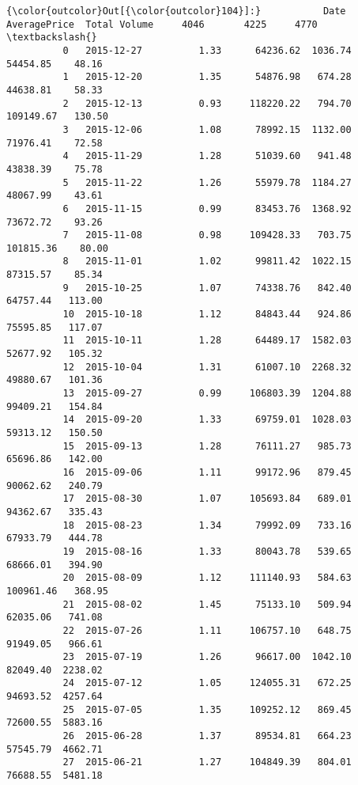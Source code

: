 \documentclass[11pt]{article}
\begin{document}
\begin{Verbatim}[commandchars=\\\{\}]
{\color{outcolor}Out[{\color{outcolor}104}]:}           Date  AveragePrice  Total Volume     4046       4225     4770  \textbackslash{}
          0   2015-12-27          1.33      64236.62  1036.74   54454.85    48.16   
          1   2015-12-20          1.35      54876.98   674.28   44638.81    58.33   
          2   2015-12-13          0.93     118220.22   794.70  109149.67   130.50   
          3   2015-12-06          1.08      78992.15  1132.00   71976.41    72.58   
          4   2015-11-29          1.28      51039.60   941.48   43838.39    75.78   
          5   2015-11-22          1.26      55979.78  1184.27   48067.99    43.61   
          6   2015-11-15          0.99      83453.76  1368.92   73672.72    93.26   
          7   2015-11-08          0.98     109428.33   703.75  101815.36    80.00   
          8   2015-11-01          1.02      99811.42  1022.15   87315.57    85.34   
          9   2015-10-25          1.07      74338.76   842.40   64757.44   113.00   
          10  2015-10-18          1.12      84843.44   924.86   75595.85   117.07   
          11  2015-10-11          1.28      64489.17  1582.03   52677.92   105.32   
          12  2015-10-04          1.31      61007.10  2268.32   49880.67   101.36   
          13  2015-09-27          0.99     106803.39  1204.88   99409.21   154.84   
          14  2015-09-20          1.33      69759.01  1028.03   59313.12   150.50   
          15  2015-09-13          1.28      76111.27   985.73   65696.86   142.00   
          16  2015-09-06          1.11      99172.96   879.45   90062.62   240.79   
          17  2015-08-30          1.07     105693.84   689.01   94362.67   335.43   
          18  2015-08-23          1.34      79992.09   733.16   67933.79   444.78   
          19  2015-08-16          1.33      80043.78   539.65   68666.01   394.90   
          20  2015-08-09          1.12     111140.93   584.63  100961.46   368.95   
          21  2015-08-02          1.45      75133.10   509.94   62035.06   741.08   
          22  2015-07-26          1.11     106757.10   648.75   91949.05   966.61   
          23  2015-07-19          1.26      96617.00  1042.10   82049.40  2238.02   
          24  2015-07-12          1.05     124055.31   672.25   94693.52  4257.64   
          25  2015-07-05          1.35     109252.12   869.45   72600.55  5883.16   
          26  2015-06-28          1.37      89534.81   664.23   57545.79  4662.71   
          27  2015-06-21          1.27     104849.39   804.01   76688.55  5481.18   

\end{Verbatim}
\end{document}
